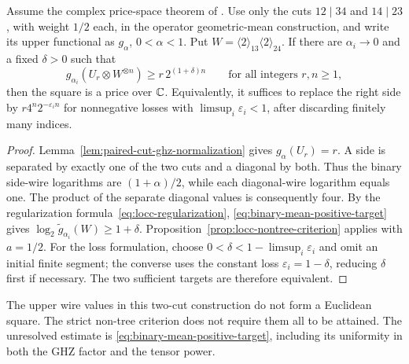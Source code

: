 \begin{corollary}
\label{cor:binary-mean-square-sufficient}
Assume the complex price-space theorem of
\cite[Proposition C.3]{Anthropic2026}.
Use only the cuts \(12\mid34\) and \(14\mid23\), with weight
\(1/2\) each, in the operator geometric-mean construction, and
write its upper functional as \(g_\alpha\), \(0<\alpha<1\).
Put \(W=\langle2\rangle_{13}\langle2\rangle_{24}\).
If there are \(\alpha_i\to0\) and a fixed \(\delta>0\) such that
\begin{equation}\label{eq:binary-mean-positive-target}
g_{\alpha_i}(U_r\otimes W^{\otimes n})
\ge r\,2^{(1+\delta)n}
\qquad\text{for all integers }r,n\ge1,
\end{equation}
then the square is a price over \(\mathbb C\).
Equivalently, it suffices to replace the right side by
\(r4^n2^{-\varepsilon_i n}\) for nonnegative losses with
\(\limsup_i\varepsilon_i<1\), after discarding finitely many
indices.
\end{corollary}
\begin{proof}
Lemma~\ref{lem:paired-cut-ghz-normalization} gives
\(g_\alpha(U_r)=r\). A side is separated by exactly one of the
two cuts and a diagonal by both. Thus the binary side-wire
logarithms are \((1+\alpha)/2\), while each diagonal-wire
logarithm equals one. The product of the separate diagonal
values is consequently four.
By the regularization formula~\eqref{eq:locc-regularization},
\eqref{eq:binary-mean-positive-target} gives
\(\log_2\widetilde g_{\alpha_i}(W)\ge1+\delta\).
Proposition~\ref{prop:locc-nontree-criterion} applies with
\(a=1/2\).
For the loss formulation, choose
\(0<\delta<1-\limsup_i\varepsilon_i\) and omit an initial
finite segment; the converse uses the constant loss
\(\varepsilon_i=1-\delta\), reducing \(\delta\) first if
necessary. The two sufficient targets are therefore equivalent.
\end{proof}

The upper wire values in this two-cut construction do not form
a Euclidean square. The strict non-tree criterion does not
require them all to be attained. The unresolved estimate is
\eqref{eq:binary-mean-positive-target}, including its uniformity
in both the GHZ factor and the tensor power.

